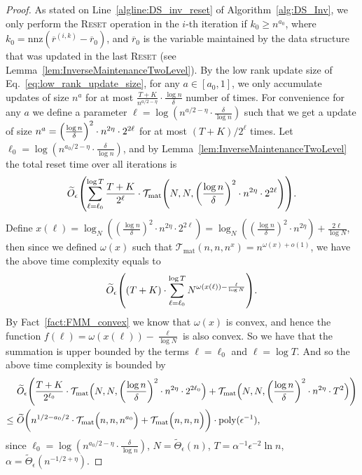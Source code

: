 \documentclass[11pt]{article}
\newcommand{\Tmat}{\mathcal{T}_{\mathrm{mat}}}
\newcommand{\nnz}{\mathrm{nnz}}
\let\originalleft\left
\let\originalright\right
\renewcommand{\left}{\mathopen{}\mathclose\bgroup\originalleft}
\renewcommand{\right}{\aftergroup\egroup\originalright}
\newcommand\rr{\boldsymbol{\mathit{r}}}
\newcommand\Otil{\widetilde{O}}
\newcommand{\wt}{\widetilde}
\newcommand{\ov}{\overline}
\DeclareMathOperator*{\poly}{{\mathrm{poly}}}
\begin{document}
\begin{proof}
As stated on Line~\ref{algline:DS_inv_reset} of Algorithm~\ref{alg:DS_Inv}, we only perform the \textsc{Reset} operation in the $i$-th iteration if $k_0 \geq n^{a_0}$, where $k_0 = \nnz(\ov{\rr}^{(i,k)} - \ov{\rr}_0)$, and $\ov{\rr}_0$ is the variable maintained by the data structure that was updated in the last \textsc{Reset} (see Lemma~\ref{lem:InverseMaintenanceTwoLevel}). By the low rank update size of Eq.~\eqref{eq:low_rank_update_size}, for any $a \in [a_0,1]$, we only accumulate updates of size $n^{a}$ for at most $\frac{T+K}{n^{a/2 - \eta}} \cdot \frac{\log n}{\delta}$ number of times. For convenience for any $a$ we define a parameter $\ell = \log (n^{a/2 - \eta} \cdot \frac{\delta}{\log n})$ such that we get a update of size $n^a = \left(\frac{\log n}{\delta}\right)^2 \cdot n^{2 \eta} \cdot 2^{2 \ell}$ for at most $(T+K)/2^{\ell}$ times. Let $\ell_0 = \log (n^{a_0/2 - \eta} \cdot \frac{\delta}{\log n})$, and by Lemma~\ref{lem:InverseMaintenanceTwoLevel} the total reset time over all iterations is
\begin{align*}
\Otil_{\epsilon}\left(\sum_{\ell = \ell_0}^{\log T} \frac{T+K}{2^{\ell}} \cdot \Tmat\left(N, N, \left(\frac{\log n}{\delta}\right)^2 \cdot n^{2 \eta} \cdot 2^{2 \ell}\right)\right). 
\end{align*}
Define $x(\ell) = \log_N((\frac{\log n}{\delta})^2 \cdot n^{2 \eta} \cdot 2^{2 \ell}) = \log_N((\frac{\log n}{\delta})^2 \cdot n^{2 \eta}) + \frac{2 \ell}{\log N}$, then since we defined $\omega(x)$ such that $\Tmat(n,n,n^x) = n^{\omega(x) + o(1)}$, we have the above time complexity equals to
\begin{align*}
\Otil_{\epsilon}\left((T+K) \cdot \sum_{\ell = \ell_0}^{\log T} N^{\omega(x(\ell)) - \frac{\ell}{\log N}}\right). 
\end{align*}
By Fact~\ref{fact:FMM_convex} we know that $\omega(x)$ is convex, and hence the function $f(\ell) = \omega(x(\ell)) - \frac{\ell}{\log N}$ is also convex. So we have that the summation is upper bounded by the terms $\ell=\ell_0$ and $\ell=\log T$. And so the above time complexity is bounded by
\begin{align*}
&~ \Otil_{\epsilon}\left(\frac{T+K}{2^{\ell_0}} \cdot \Tmat\Big(N, N, \left(\frac{\log n}{\delta}\right)^2 \cdot n^{2 \eta} \cdot 2^{2 \ell_0}\Big) + \Tmat\Big(N, N, \left(\frac{\log n}{\delta}\right)^2 \cdot n^{2 \eta} \cdot T^2 \Big)\right) \\ 
\leq &~ \wt{O}\left(n^{1/2-a_0/2} \cdot \Tmat\Big(n, n, n^{a_0} \Big) + \Tmat\Big(n, n, n\Big)\right) \cdot \poly(\epsilon^{-1}),
\end{align*}
since $\ell_0 = \log (n^{a_0/2 - \eta} \cdot \frac{\delta}{\log n})$, $N = \widetilde{\Theta}_{\epsilon}(n )$, $T = \alpha^{-1}\epsilon^{-2}\ln n$, $\alpha = \widetilde{\Theta}_{\epsilon}(n^{-1/2+\eta})$. 


\end{proof}
\end{document}
